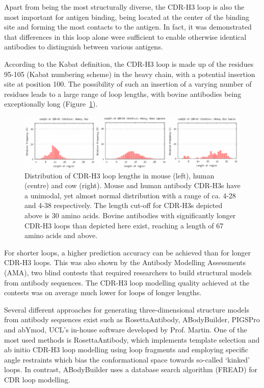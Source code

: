 \documentclass[12pt]{article}
\begin{document}
Apart from being the most structurally diverse, the CDR-H3 loop is
also the most important for antigen binding, being located at the
center of the binding site and forming the most contacts to the
antigen\cite{MacCallum1996}. In fact, it was demonstrated that
differences in this loop alone were sufficient to enable otherwise
identical antibodies to distinguish between various
antigens\cite{Xu2000}.

According to the Kabat definition, the CDR-H3 loop is made up of the
residues 95-105 (Kabat numbering scheme\cite{Kabat1992}) in the heavy
chain, with a potential insertion site at position 100. The
possibility of such an insertion of a varying number of residues leads
to a large range of loop lengths, with bovine antibodies being
exceptionally long (Figure~\ref{fig:loopdist}).

\begin{figure}
  \includegraphics[scale=1]{loopdist.eps}
  \centering
  \caption { Distribution of CDR-H3 loop lengths in mouse (left),
    human (centre) and cow (right). Mouse and human antibody CDR-H3s
    have a unimodal, yet almost normal distribution with a range of
    ca. 4-28 and 4-38 respectively. The length cut-off for CDR-H3s
    depicted above is 30 amino acids. Bovine antibodies with
    significantly longer CDR-H3 loops than depicted here exist,
    reaching a length of 67 amino acids and
    above\protect\cite{Wong2015}.}  
  \label{fig:loopdist}
\end{figure}

For shorter loops, a higher prediction accuracy can be achieved than
for longer CDR-H3 loops. This was also shown by the Antibody Modelling
Assessments (AMA), two blind contests that required researchers to
build structural models from antibody sequences. The CDR-H3 loop
modelling quality achieved at the contests was on average much lower
for loops of longer lengths\cite{Almagro2011,Almagro2014}.

Several different approaches for generating three-dimensional
structure models from antibody sequences exist such as
RosettaAntibody\cite{Sircar2009,Sivasubramanian2009}, 
ABodyBuilder\cite{Leem2016}, PIGSPro\cite{Lepore2017} and abYmod,
UCL's in-house software developed by Prof. Martin. One of the most
used methods is RosettaAntibody, which implements template selection
and ab initio CDR-H3 loop modelling using loop fragments and employing
specific angle restraints which bias the conformational space towards
so-called `kinked' loops\cite{Schoeder2021,Weitzner2017}. In
contrast, ABodyBuilder uses a database search algorithm
(FREAD\cite{Choi2010}) for CDR loop modelling.
\end{document}
